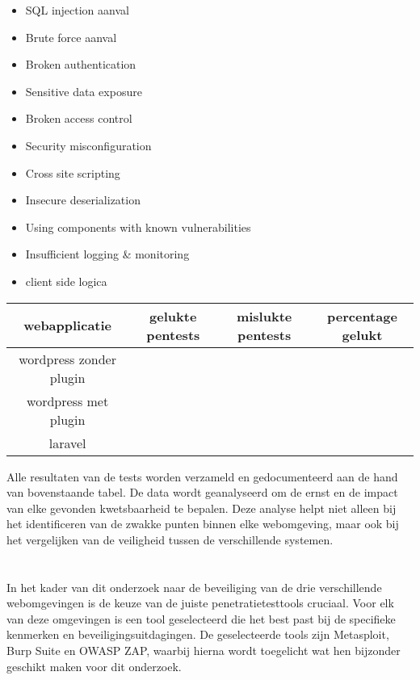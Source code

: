 \begin{itemize}
    \item SQL injection aanval
    \item Brute force aanval
    \item Broken authentication
    \item Sensitive data exposure
    \item Broken access control
    \item Security misconfiguration
    \item Cross site scripting
    \item Insecure deserialization
    \item Using components with known vulnerabilities
    \item Insufficient logging \& monitoring 
    \item client side logica
\end{itemize}

\begin{tabular}{ | c | c | c | c |}
    \hline			
    webapplicatie & gelukte pentests & mislukte pentests & percentage gelukt \\
    \hline  
    wordpress zonder plugin & & & \\
    wordpress met plugin & & & \\
    laravel &  &  & \\
\end{tabular}
Alle resultaten van de tests worden verzameld en gedocumenteerd aan de hand van bovenstaande tabel. De data wordt geanalyseerd 
om de ernst en de impact van elke gevonden kwetsbaarheid te bepalen. Deze analyse helpt niet alleen bij 
het identificeren van de zwakke punten binnen elke webomgeving, maar ook bij het vergelijken van de 
veiligheid tussen de verschillende systemen.

\section{}
In het kader van dit onderzoek naar de beveiliging van de drie verschillende webomgevingen is de keuze van 
de juiste penetratietesttools cruciaal. Voor elk van deze omgevingen is een tool geselecteerd die het 
best past bij de specifieke kenmerken en beveiligingsuitdagingen. De geselecteerde tools zijn 
Metasploit, Burp Suite en OWASP ZAP, waarbij hierna wordt toegelicht wat hen bijzonder geschikt maken voor dit onderzoek.
